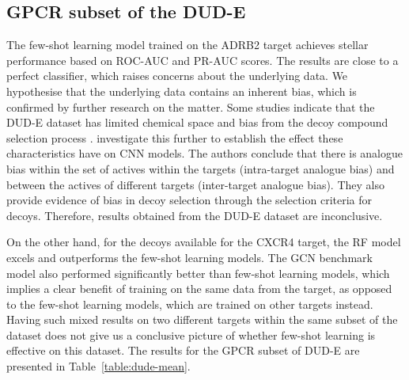 \documentclass[journal=jcisd8,manuscript=article]{achemso} %
\begin{document}
\subsection{GPCR subset of the DUD-E}

The few-shot learning model trained on the ADRB2 target achieves stellar performance based on ROC-AUC and PR-AUC scores. The results are close to a perfect classifier, which raises concerns about the underlying data. We hypothesise that the underlying data contains an inherent bias, which is confirmed by further research on the matter. Some studies indicate that the DUD-E dataset has limited chemical space and bias from the decoy compound selection process \cite{smusz2013influence, wallach2018most}. \citet{chen2019hidden} investigate this further to establish the effect these characteristics have on CNN models. The authors conclude that there is analogue bias within the set of actives within the targets (intra-target analogue bias) and between the actives of different targets (inter-target analogue bias). They also provide evidence of bias in decoy selection through the selection criteria for decoys. Therefore, results obtained from the DUD-E dataset are inconclusive.

On the other hand, for the decoys available for the CXCR4 target, the RF model excels and outperforms the few-shot learning models. The GCN benchmark model also performed significantly better than few-shot learning models, which implies a clear benefit of training on the same data from the target, as opposed to the few-shot learning models, which are trained on other targets instead. Having such mixed results on two different targets within the same subset of the dataset does not give us a conclusive picture of whether few-shot learning is effective on this dataset. The results for the GPCR subset of DUD-E are presented in Table~\ref{table:dude-mean}.
\end{document}

